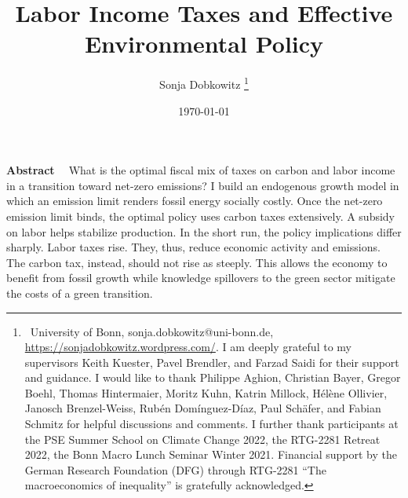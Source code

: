 \documentclass[12pt]{article}
\title{Labor Income Taxes and Effective Environmental Policy}
\author{Sonja Dobkowitz
\thanks{\ {University of Bonn, sonja.dobkowitz@uni-bonn.de, \url{https://sonjadobkowitz.wordpress.com/}.} \newline
	I am deeply grateful to my supervisors Keith Kuester, Pavel Brendler, and Farzad Saidi for their support and guidance. 
	I would like to thank Philippe Aghion, Christian Bayer, Gregor Boehl, Thomas Hintermaier,  Moritz Kuhn, Katrin Millock, Hélène Ollivier,  Janosch Brenzel-Weiss, Rubén Domínguez-Díaz, Paul Schäfer, and Fabian Schmitz for helpful discussions and comments.  
	I further thank participants at the PSE Summer School on Climate Change 2022, the RTG-2281 Retreat 2022, the Bonn Macro Lunch Seminar Winter 2021.
	Financial support by the German Research Foundation (DFG) through RTG-2281 “The macroeconomics of inequality” is gratefully acknowledged.}}
\date{\today %
}
\renewenvironment{abstract}
{\small
	\list{}{
		\setlength{\leftmargin}{0.025\textwidth}%
		\setlength{\rightmargin}{\leftmargin}%
	}%
	\item\relax}
{\endlist}
\begin{document}
%	
	\maketitle
	\begin{abstract}
		\begin{onehalfspacing}
			\textbf{Abstract \ }
What is the optimal fiscal mix of taxes on carbon and labor income in a transition toward net-zero emissions? I build an endogenous growth model in which an emission limit renders fossil energy socially costly. Once the net-zero emission limit binds, the optimal policy uses carbon taxes extensively. A subsidy on labor helps stabilize production. In the short run, the policy implications differ sharply. Labor taxes rise. They, thus, reduce economic activity and emissions. The carbon tax, instead, should not rise as steeply. This allows the economy to benefit from fossil growth while knowledge spillovers to the green sector mitigate the costs of a green transition.

			
		\end{onehalfspacing}
		\end{abstract}






%

%
%


\end{document}
